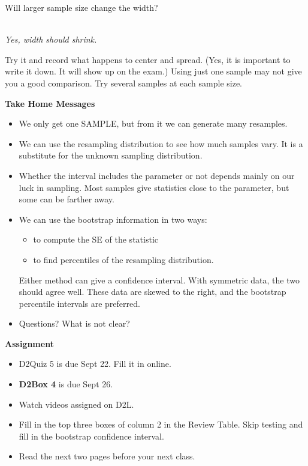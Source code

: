 \begin{enumerate}
   Will larger sample size  change the width?\\
\begin{students}
        \vspace{.5cm}        
\end{students}
\begin{key}
\\ {\it Yes, width should shrink.}
\end{key}

   Try it and record what happens to center and spread.  (Yes, it is
   important to write it down. It will show up on the exam.)  Using
   just one sample may not give you a good comparison.  Try several
   samples at each sample size. 
   \vfill
\end{enumerate}

\begin{center}
  {\bf Take Home Messages}
\end{center}
\begin{itemize}
  \item   We only get one SAMPLE, but from it we can generate many
    resamples.
  \item We can use the resampling distribution to see how much
    samples vary. It is a substitute for the unknown sampling
    distribution.
  \item Whether the interval includes the parameter or not
    depends mainly on our luck in sampling.  Most samples give statistics
    close to the parameter, but some can be farther away.
  \item We can use the bootstrap information in two ways:
    \begin{itemize}
    \item to compute the SE of the statistic
    \item to find percentiles of the resampling distribution.
    \end{itemize}
   Either method can give a confidence interval.  With symmetric data, the
   two should agree well.  These data are skewed to the right, and the
   bootstrap percentile intervals are preferred.
 \item 
  Questions?  What is not clear?\vfill
  \end{itemize}
  

\noindent
{\bf Assignment} \vspace{-.2in}
\begin{itemize}
\item  D2Quiz 5 is due Sept 22.  Fill it in online.
\item {\bf D2Box 4} is due Sept 26. 
\item Watch videos assigned on D2L.
 \item Fill in the top three boxes of column 2 in the Review
   Table. Skip testing and fill in the bootstrap confidence interval. 
\item Read the next two pages before your next class.
\end{itemize}


